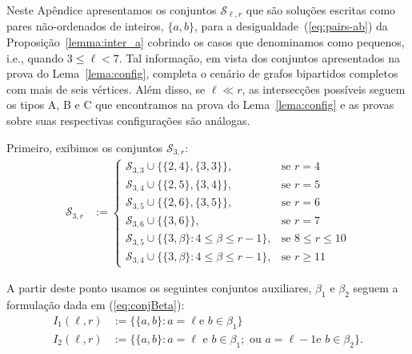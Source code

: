 \documentclass[12pt,a4paper]{book}
\newcommand{\Slr}{\mathcal{S}_{\ell,r}} %
\begin{document}
Neste Apêndice apresentamos os conjuntos $\Slr$ 
que são soluções escritas como pares não-ordenados de inteiros, $\{a,b\}$, para a desigualdade~(\ref{eq:pairs-ab})
da Proposição~\ref{lemma:inter_a} cobrindo os casos que denominamos como pequenos, i.e., quando $3 \leq \ell < 7$. 
Tal informação, em vista dos conjuntos apresentados na prova do Lema~\ref{lema:config}, completa o cenário de grafos bipartidos completos com mais de seis vértices.
%
Além disso, se $\ell \ll r$, as intersecções possíveis seguem os tipos A, B e C que encontramos na prova do Lema~\ref{lema:config} e as provas sobre suas respectivas configurações são análogas.  

Primeiro, exibimos os conjuntos $\mathcal{S}_{3,r}$:
\begin{equation*}%
     \begin{aligned}
        \mathcal{S}_{3, r}
            &:=
    \begin{cases}
        \mathcal{S}_{3,3} \cup \{\{2,4\}, \{3,3\}\}, 
        & \text{se }  r=4   \\ 
        \mathcal{S}_{3,4} \cup \{\{2,5\}, \{3,4\}\}, 
        & \text{se }  r=5    \\ 
        \mathcal{S}_{3,5} \cup \{\{2,6\}, \{3,5\}\}, 
        & \text{se }  r=6    \\ 
         \mathcal{S}_{3,6} \cup \{\{3,6\}\}, 
        & \text{se }  r=7    \\ 
		\mathcal{S}_{3,5} \cup \{\{3,\beta\}: 4 \leq \beta \leq r-1\}, & \text{se }  8\leq r \leq 10 \\
        \mathcal{S}_{3,4} \cup \{\{3,\beta\}: 4 \leq \beta \leq r-1\}, & \text{se }  r \geq 11
        \end{cases}
    \end{aligned}  
\end{equation*}

A partir deste ponto usamos os seguintes conjuntos auxiliares, $\beta_1$ e $\beta_2$ seguem a formulação dada em (\ref{eq:conjBeta}):
\begin{equation*}
    \begin{aligned}
        I_1(\ell,r) &:= \{\{a,b\}: a=\ell\text{
    e }b\in \beta_1\}
        \\
        I_2(\ell,r) &:= \{\{a,b\}: a=\ell\text{ e }b\in \beta_1;\text{ ou }a=\ell-1\text{
    e }b\in \beta_2\}.
    \end{aligned}
\end{equation*}
\end{document}

